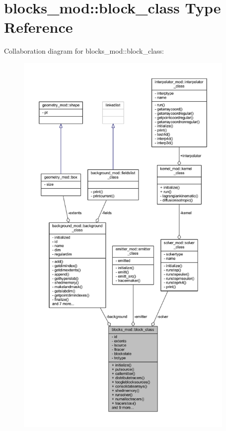 \hypertarget{structblocks__mod_1_1block__class}{}\section{blocks\+\_\+mod\+:\+:block\+\_\+class Type Reference}
\label{structblocks__mod_1_1block__class}


Collaboration diagram for blocks\+\_\+mod\+:\+:block\+\_\+class\+:\nopagebreak
\begin{figure}[H]
\begin{center}
\leavevmode
\includegraphics[height=550pt]{structblocks__mod_1_1block__class__coll__graph}
\end{center}
\end{figure}
